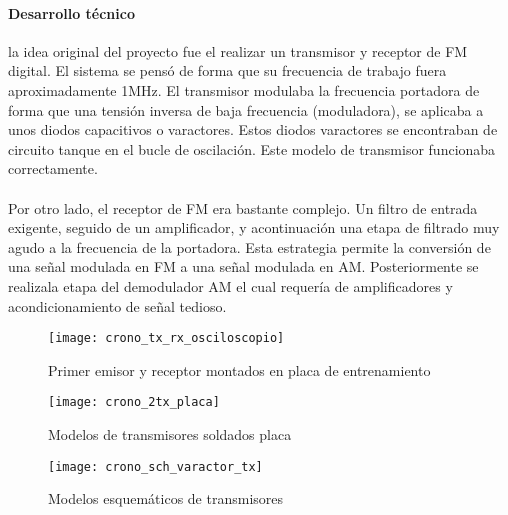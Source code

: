 \paragraph{Desarrollo técnico}
la idea original del proyecto fue el realizar un transmisor y receptor de FM digital. El sistema se pensó de forma que su frecuencia de trabajo fuera aproximadamente 1MHz. 
El transmisor modulaba la frecuencia portadora de forma que una tensión inversa de baja frecuencia (moduladora), se aplicaba a unos diodos capacitivos o varactores. Estos diodos varactores se encontraban de circuito tanque en el bucle de oscilación.
Este modelo de transmisor funcionaba correctamente.

\paragraph{}
Por otro lado, el receptor de FM era bastante complejo. Un filtro de entrada exigente, seguido de un amplificador, y acontinuación una etapa de filtrado muy agudo a la frecuencia de la portadora. Esta estrategia permite la conversión de una señal modulada en FM a una señal modulada en AM. Posteriormente se realizala etapa del demodulador AM el cual requería de amplificadores y acondicionamiento de señal tedioso.  
\begin{figure}[h]
    \centering
    \texttt{[image: crono\_tx\_rx\_osciloscopio]}
    \caption{Primer emisor y receptor montados en placa de entrenamiento}
    \label{fig:crono_tx_rx_osciloscopio}
\end{figure}

\begin{figure}[h]
    \centering
    \texttt{[image: crono\_2tx\_placa]}
    \caption{Modelos de transmisores soldados placa}
    \label{fig:crono_2tx_placa}
\end{figure}

\begin{figure}[h]
    \centering
    \texttt{[image: crono\_sch\_varactor\_tx]}
    \caption{Modelos esquemáticos de transmisores} 
    \label{fig:crono_sch_varactor_tx}
\end{figure}

